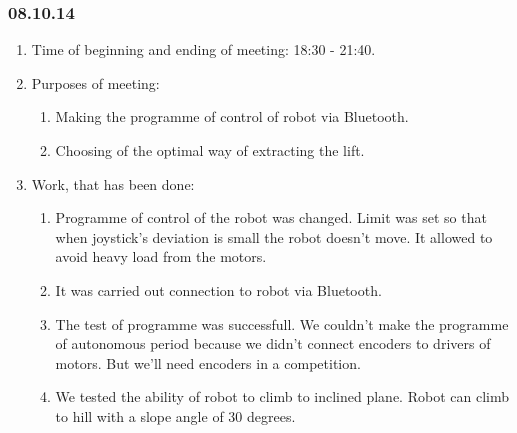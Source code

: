 
\subsubsection{08.10.14}

\begin{enumerate}
	\item Time of beginning and ending of meeting: 18:30 - 21:40.
	\item Purposes of meeting:
	\begin{enumerate}
	  \item Making the programme of control of robot via Bluetooth.
	  
	  \item Choosing of the optimal way of extracting the lift.
	  
    \end{enumerate}
	\item Work, that has been done:
	\begin{enumerate}
	  \item Programme of control of the robot was changed. Limit was set so that when joystick's deviation is small the robot doesn't move. It allowed to avoid heavy load from the motors.
      
      \item It was carried out connection to robot via Bluetooth.
      
      \item The test of programme was successfull. We couldn't make the programme of autonomous period because we didn't connect encoders to drivers of motors. But we'll need encoders in a competition.
      
      \item We tested the ability of robot to climb to inclined plane. Robot can climb to hill with a slope angle of 30 degrees.
       

\end{enumerate}
\end{enumerate}
